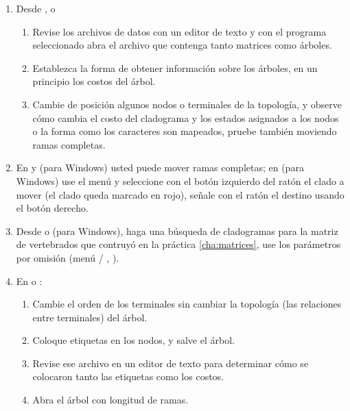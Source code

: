 \begin{enumerate}

	\item Desde ,  o 
	\begin{enumerate}
		\item Revise los archivos de datos con un editor de texto y con el programa seleccionado abra el archivo que contenga tanto matrices como \'arboles.
		\item Establezca la forma de obtener informaci\'on sobre los \'arboles, en un principio los costos del \'arbol.
		\item Cambie de posici\'on algunos nodos o terminales de la topolog\'ia, y observe c\'omo cambia el costo del cladograma y los estados asignados a los nodos o la forma como los caracteres son mapeados, pruebe tambi\'en moviendo ramas completas.
	\end{enumerate}

	\item En  y  (para Windows) usted puede mover ramas completas; en  (para Windows) use el men\'u  y seleccione con el bot\'on izquierdo del rat\'on el clado a mover (el clado queda marcado en rojo), se\~nale con el rat\'on el destino usando el bot\'on derecho.
	\item Desde  o  (para Windows), haga una b\'usqueda de cladogramas para la matriz de vertebrados que contruy\'o en la pr\'actica \ref{cha:matrices}, use los par\'ametros por omisi\'on (men\'u  / , ).
	\item En  o :
	\begin{enumerate}
		\item Cambie el orden de los terminales sin cambiar la topolog\'ia (las relaciones entre terminales) del \'arbol.
		\item Coloque etiquetas en los nodos, y salve el \'arbol.
		\item Revise ese archivo en un editor de texto para determinar c\'omo se colocaron tanto las etiquetas como los costos.
		\item  Abra el \'arbol con longitud  de ramas.
	\end{enumerate}



\end{enumerate}
